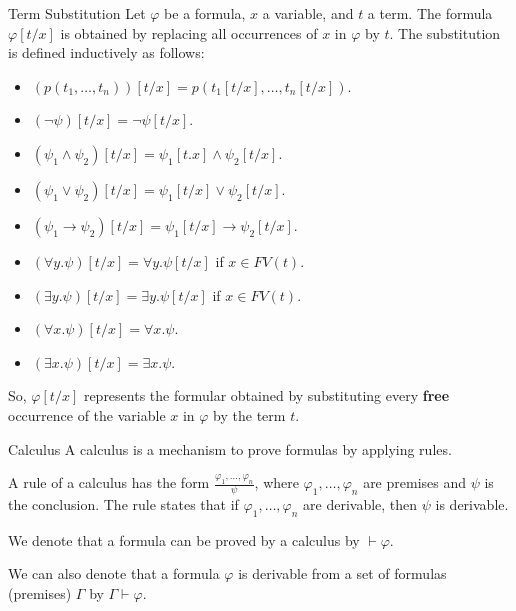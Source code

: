 \documentclass{beamer}
\begin{document}
  \begin{frame}{Term Substitution}
    Let $\varphi$ be a formula, $x$ a variable, and $t$ a term. The formula $\varphi[t/x]$ is obtained by replacing all occurrences of $x$ in $\varphi$ by $t$. The substitution is defined inductively as follows:
    \begin{itemize}
    \item $(p(t_1, \ldots, t_n))[t/x]=p(t_1[t/x], \ldots, t_n[t/x])$.
    \item $(\neg\psi)[t/x]=\neg\psi[t/x]$.
    \item $(\psi_1\wedge\psi_2)[t/x]=\psi_1[t.x]\wedge\psi_2[t/x]$.
    \item $(\psi_1\vee\psi_2)[t/x]=\psi_1[t/x]\vee\psi_2[t/x]$.
    \item $(\psi_1\rightarrow\psi_2)[t/x]=\psi_1[t/x]\rightarrow\psi_2[t/x]$.
    \item   $(\forall y.\psi)[t/x]=\forall y.\psi[t/x]$ if $x\in FV(t)$.
    \item $(\exists y.\psi)[t/x]=\exists y.\psi[t/x]$ if $x\in FV(t)$.
    \item $(\forall x.\psi)[t/x]=\forall x.\psi$.
    \item $(\exists x.\psi)[t/x]=\exists x.\psi$.
    \end{itemize}

    So, $\varphi[t/x]$ represents the formular obtained by substituting every \textbf{free} occurrence of the variable $x$ in $\varphi$ by the term $t$.
  \end{frame}
    
  \begin{frame}{Calculus}
    A calculus is a mechanism to prove formulas by applying rules.

    A rule of a calculus has the form $\frac{\varphi_1, \ldots, \varphi_n}{\psi}$, where $\varphi_1, \ldots, \varphi_n$ are premises and $\psi$ is the conclusion. The rule states that if $\varphi_1, \ldots, \varphi_n$ are derivable, then $\psi$ is derivable.

    We denote that a formula can be proved by a calculus by $\vdash\varphi$.

    We can also denote that a formula $\varphi$ is derivable from a set of formulas (premises) $\Gamma$ by $\Gamma\vdash\varphi$.
  \end{frame}
\end{document}
